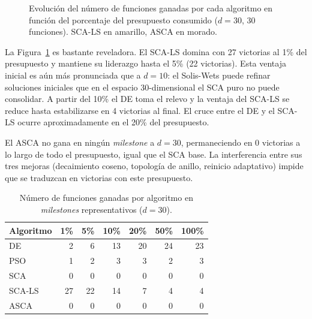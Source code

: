 \documentclass[12pt,a4paper]{article}
\begin{document}
\begin{figure}[H]
\caption{Evolución del número de funciones ganadas por cada algoritmo en función del porcentaje del presupuesto consumido ($d=30$, 30 funciones). SCA-LS en amarillo, ASCA en morado.}
\label{fig:convergencia_wins_sca_ls_d30}
\end{figure}
 
La Figura~\ref{fig:convergencia_wins_sca_ls_d30} es bastante reveladora. El SCA-LS domina con {27 victorias al 1\% del presupuesto} y mantiene su liderazgo hasta el 5\% (22 victorias). Esta ventaja inicial es aún más pronunciada que a $d=10$: el Solis-Wets puede refinar soluciones iniciales que en el espacio 30-dimensional el SCA puro no puede consolidar. A partir del 10\% el DE toma el relevo y la ventaja del SCA-LS se reduce hasta estabilizarse en 4 victorias al final. El cruce entre el DE y el SCA-LS ocurre aproximadamente en el 20\% del presupuesto.
 
El ASCA no gana en ningún \textit{milestone} a $d=30$, permaneciendo en 0 victorias a lo largo de todo el presupuesto, igual que el SCA base. La interferencia entre sus tres mejoras (decaimiento coseno, topología de anillo, reinicio adaptativo) impide que se traduzcan en victorias con este presupuesto.
 
\begin{table}[H]
\centering
\caption{Número de funciones ganadas por algoritmo en \textit{milestones} representativos ($d=30$).}
\label{tab:resumen_victorias_sca_ls_d30}
\renewcommand{\arraystretch}{1.2}
\begin{tabular}{lrrrrrr}
\toprule
\textbf{Algoritmo} & \textbf{1\%} & \textbf{5\%} & \textbf{10\%} & \textbf{20\%} & \textbf{50\%} & \textbf{100\%} \\
\midrule
DE      &  2 &  6 & 13 & 20 & 24 & 23 \\
PSO     &  1 &  2 &  3 &  3 &  2 &  3 \\
SCA     &  0 &  0 &  0 &  0 &  0 &  0 \\
SCA-LS  & 27 & 22 & 14 &  7 &  4 &  4 \\
ASCA    &  0 &  0 &  0 &  0 &  0 &  0 \\
\bottomrule
\end{tabular}
\end{table}
 
\end{document}
